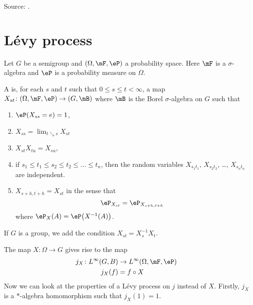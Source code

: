 Source: \cite{UweLevy}.

\section{Lévy process}

Let $G$ be a semigroup and $(\Omega,\mF,\eP)$ a probability space. Here $\mF$ is a $\sigma$-algebra and $\eP$ is a probability measure on $\Omega$.
\begin{definition}
    A  is, for each $s$ and $t$ such that $0\leq s\leq t<\infty$, a map $X_{st}\colon (\Omega,\mF,\eP)\to (G,\mB)$ where $\mB$ is the Borel $\sigma$-algebra on $G$ such that
    \begin{enumerate}
        \item
            $\eP(X_{ss}=e)=1$,
        \item
            $X_{ss}=\lim_{t\searrow s}X_{st}$
        \item
            $X_{st}X_{tu}=X_{su}$,
        \item
            if $s_1\leq t_1\leq s_2\leq t_2\leq \ldots\leq t_n$, then the random variables $X_{s_1t_1}$, $X_{s_2t_2}$, \ldots, $X_{s_nt_n}$ are independent.
        \item
            $X_{s+h,t+h}=X_{st}$ in the sense that
            \begin{equation}
                \eP_{X_{st}}=\eP_{X_{s+h,t+h}}
            \end{equation}
            where $\eP_X(A)=\eP\big( X^{-1}(A) \big)$.
    \end{enumerate}
    If $G$ is a group, we add the condition $X_{st}=X_s^{-1}X_t$.
\end{definition}

The map $X\colon \Omega\to G$ gives rise to the map
\begin{equation}
    \begin{aligned}
        j_X\colon L^{\infty}(G,B)&\to L^{\infty}(\Omega,\mF,\eP) \\
        j_X(f)&=f\circ X 
    \end{aligned}
\end{equation}
Now we can look at the properties of a Lévy process on $j$ instead of $X$. Firstly, $j_X$ is a $*$-algebra homomorphism such that $j_X(1)=1$.

